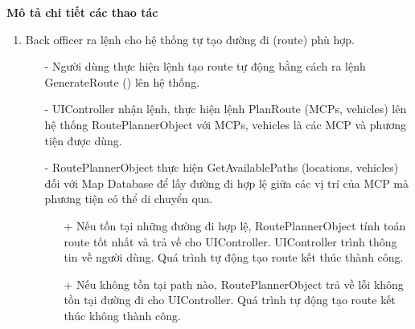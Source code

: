         \textbf{Mô tả chi tiết các thao tác}
        \begin{enumerate}
            \item Back officer ra lệnh cho hệ thống tự tạo đường đi (route) phù hợp.
            \begin{itemize}
                \item[-] Người dùng thực hiện lệnh tạo route tự động bằng cách ra lệnh GenerateRoute () lên hệ thống.
                \item[-] UIController nhận lệnh, thực hiện lệnh PlanRoute (MCPs, vehicles) lên hệ thống RoutePlannerObject với MCPs, vehicles là các MCP và phương tiện được dùng.
                \item[-] RoutePlannerObject thực hiện GetAvailablePaths (locations, vehicles) đối với Map Database để lấy đường đi hợp lệ giữa các vị trí của MCP mà phương tiện có thể di chuyển qua.
                \begin{itemize}
                    \item[+] Nếu tồn tại những đường đi hợp lệ, RoutePlannerObject tính toán route tốt nhất và trả về cho UIController. UIController trình thông tin về người dùng. Quá trình tự động tạo route kết thúc thành công.
                    \item[+] Nếu không tồn tại path nào, RoutePlannerObject trả về lỗi không tồn tại đường đi cho UIController. Quá trình tự động tạo route kết thúc không thành công.
                \end{itemize}
            \end{itemize}
        

\end{enumerate}
